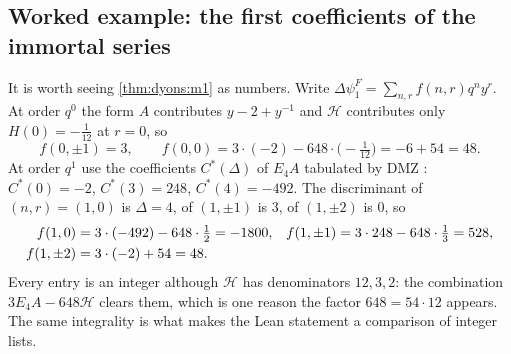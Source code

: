 \subsection*{Worked example: the first coefficients of the immortal series}

It is worth seeing \cref{thm:dyons:m1} as numbers. Write
$\Delta\psi^F_1=\sum_{n,r}f(n,r)q^ny^r$. At order $q^0$ the form $A$ contributes
$y-2+y^{-1}$ and $\mathcal H$ contributes only $H(0)=-\tfrac1{12}$ at $r=0$, so
\begin{equation}\label{eq:dyons:immq0}
  f(0,\pm1)=3,\qquad f(0,0)=3\cdot(-2)-648\cdot\bigl(-\tfrac1{12}\bigr)=-6+54=48 .
\end{equation}
At order $q^1$ use the coefficients $C^*(\Delta)$ of $E_4A$ tabulated by DMZ
: $C^*(0)=-2$, $C^*(3)=248$, $C^*(4)=-492$. The discriminant
of $(n,r)=(1,0)$ is $\Delta=4$, of $(1,\pm1)$ is $3$, of $(1,\pm2)$ is $0$, so
\begin{align}\label{eq:dyons:immq1}
  f(1,0)&=3\cdot(-492)-648\cdot\tfrac12=-1800, &
  f(1,\pm1)&=3\cdot248-648\cdot\tfrac13=528,\notag\\
  f(1,\pm2)&=3\cdot(-2)+54=48 . &&
\end{align}
Every entry is an integer although $\mathcal H$ has denominators $12,3,2$: the combination
$3E_4A-648\mathcal H$ clears them, which is one reason the factor $648=54\cdot12$ appears. The
same integrality is what makes the Lean statement a comparison of integer lists.

